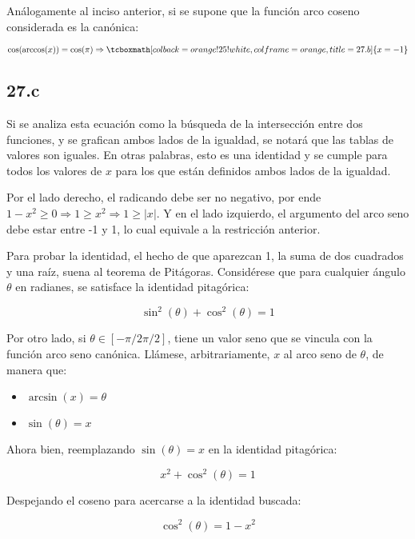 \documentclass{article}
\newcommand{\hresult}[2]{\tcboxmath[colback=orange!25!white,colframe=orange, title=#1] {#2} }
\newcommand{\subsectionx}[1]{\subsection*{#1}\label{subsec:#1}\addcontentsline{toc}{subsection}{\nameref{subsec:#1}}}
\begin{document}
Análogamente al inciso anterior, si se supone que la función arco coseno considerada es la canónica:

\begin{equation}
\cos( \arccos(x) ) = \cos( \pi ) \Rightarrow \hresult{27.b}{ x = -1 }
\end{equation}

\subsectionx{27.c}

Si se analiza esta ecuación como la búsqueda de la intersección entre dos funciones, y se grafican ambos lados de la igualdad, se notará que las tablas de valores son iguales. En otras palabras, esto es una identidad y se cumple para todos los valores de $ x $ para los que están definidos ambos lados de la igualdad.

Por el lado derecho, el radicando debe ser no negativo, por ende $ 1 - x^2 \geq 0 \Rightarrow 1 \geq x^2 \Rightarrow 1 \geq |x| $. Y en el lado izquierdo, el argumento del arco seno debe estar entre -1 y 1, lo cual equivale a la restricción anterior.

Para probar la identidad, el hecho de que aparezcan 1, la suma de dos cuadrados y una raíz, suena al teorema de Pitágoras. Considérese que para cualquier ángulo $ \theta $ en radianes, se satisface la identidad pitagórica:

\begin{equation}
\sin^2( \theta ) + \cos^2( \theta ) = 1
\end{equation}

Por otro lado, si $ \theta \in [ -\pi/2 \pi/2 ] $, tiene un valor seno que se vincula con la función arco seno canónica. Llámese, arbitrariamente, $x$ al arco seno de $ \theta $, de manera que:

\begin{itemize}

\item $ \arcsin(x) = \theta $

\item $ \sin( \theta ) = x $

\end{itemize}

Ahora bien, reemplazando $ \sin(\theta) = x $ en la identidad pitagórica:

\begin{equation}
x^2 + \cos^2( \theta ) = 1
\end{equation}

Despejando el coseno para acercarse a la identidad buscada:

\begin{equation}
\cos^2( \theta ) = 1 - x^2
\end{equation}
\end{document}
